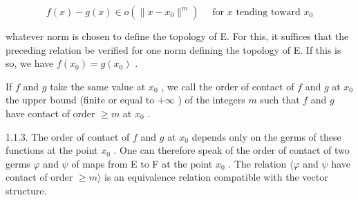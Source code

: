 \[
f (x) - g (x) \in o (\| x - x _ {0} \| ^ {m}) \quad \text { for } x \text { tending   toward } x _ {0}
\]

whatever norm is chosen to define the topology of E. For this, it suffices that the preceding relation be verified for one norm defining the topology of E. If this is so, we have \(f(x_0) = g(x_0)\) .

If \(f\) and \(g\) take the same value at \(x_{0}\) , we call the order of contact of \(f\) and \(g\) at \(x_{0}\) the upper bound (finite or equal to \(+\infty\) ) of the integers \(m\) such that \(f\) and \(g\) have contact of order \(\geqslant m\) at \(x_{0}\) .

1.1.3. The order of contact of \(f\) and \(g\) at \(x_{0}\) depends only on the germs of these functions at the point \(x_{0}\) . One can therefore speak of the order of contact of two germs \(\varphi\) and \(\psi\) of maps from E to F at the point \(x_{0}\) . The relation \(\langle\varphi\) and \(\psi\) have contact of order \(\geqslant m\rangle\) is an equivalence relation compatible with the vector structure.

